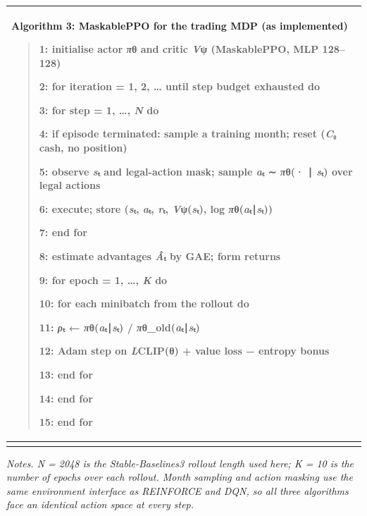 {\def\LTcaptype{none} %
\begin{longtable}[]{@{}
  >{\raggedright\arraybackslash}p{}@{}}
\toprule\noalign{}
\begin{minipage}[b]{\linewidth}\raggedright
\textbf{Algorithm 3: MaskablePPO for the trading MDP (as implemented)}

\begin{quote}
1: \textbf{initialise} actor \emph{π}θ and critic \emph{V}ψ
(MaskablePPO, MLP 128--128)

2: \textbf{for} iteration = 1, 2, \ldots{} until step budget exhausted
\textbf{do}

3: \textbf{for} step = 1, \ldots, \emph{N} \textbf{do}

4: \textbf{if} episode terminated: sample a training month; reset
(\emph{C}₀ cash, no position)

5: observe \emph{s}ₜ and legal-action mask; sample \emph{a}ₜ ∼
\emph{π}θ(· ∣ \emph{s}ₜ) over legal actions

6: execute; store (\emph{s}ₜ, \emph{a}ₜ, \emph{r}ₜ,
\emph{V}ψ(\emph{s}ₜ), log \emph{π}θ(\emph{a}ₜ∣\emph{s}ₜ))

7: \textbf{end for}

8: estimate advantages \emph{Â}ₜ by GAE; form returns

9: \textbf{for} epoch = 1, \ldots, \emph{K} \textbf{do}

10: \textbf{for} each minibatch from the rollout \textbf{do}

11: \emph{ρ}ₜ ← \emph{π}θ(\emph{a}ₜ∣\emph{s}ₜ) /
\emph{π}θ\_old(\emph{a}ₜ∣\emph{s}ₜ)

12: Adam step on \emph{L}CLIP(θ) + value loss − entropy bonus

13: \textbf{end for}

14: \textbf{end for}

15: \textbf{end for}
\end{quote}
\end{minipage} \\
\midrule\noalign{}
\endhead
\bottomrule\noalign{}
\endlastfoot
\end{longtable}
}

\emph{Notes. N = 2048 is the Stable-Baselines3 rollout length used here;
K = 10 is the number of epochs over each rollout. Month sampling and
action masking use the same environment interface as REINFORCE and DQN,
so all three algorithms face an identical action space at every step.}


